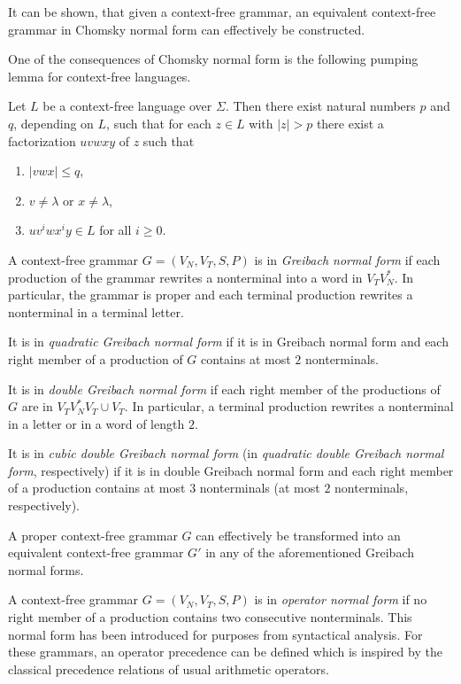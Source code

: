 It can be shown, that given a context-free grammar, an equivalent context-free grammar in Chomsky normal form can effectively be constructed.

One of the consequences of Chomsky normal form is the following pumping lemma for context-free languages.

\begin{lemma}
Let $L$ be a context-free language over $\Sigma$. Then there exist natural numbers $p$ and $q$, depending on $L$, such that for each $z \in L$ with $|z| > p$ there exist a factorization $u v w x y$ of $z$ such that
\begin{enumerate}
\item $|vwx| \le q$,
\item $v \neq \lambda$ or $x \neq \lambda$,
\item $u v^i w x^i y \in L$ for all $i \ge 0$.
\end{enumerate}
\end{lemma}

A context-free grammar $G = (V_N, V_T, S, P)$ is in \emph{Greibach normal form} if each production of the grammar rewrites a nonterminal into a word in $V_T V_N^*$. In particular, the grammar is proper and each terminal production rewrites a nonterminal in a terminal letter.

It is in \emph{quadratic Greibach normal form} if it is in Greibach normal form and each right member of a production of $G$ contains at most $2$ nonterminals.

It is in \emph{double Greibach normal form} if each right member of the productions  of $G$ are in $V_T V_N^* V_T \cup V_T$. In particular, a terminal production  rewrites a nonterminal in a letter or in a word of length $2$.

It is in \emph{cubic double Greibach normal form} (in \emph{quadratic double Greibach normal form}, respectively) if it is in double Greibach normal form and each right member of a production contains at most $3$ nonterminals (at most $2$ nonterminals, respectively).

A proper context-free grammar $G$ can effectively be transformed into an equivalent context-free grammar $G'$ in any of the aforementioned Greibach normal forms.

A context-free grammar $G = (V_N, V_T, S, P)$ is in \emph{operator normal form} if no right member of a production contains two consecutive nonterminals. This normal form has been introduced for purposes from syntactical analysis. For these grammars, an operator precedence can be defined which is inspired by the classical precedence relations of usual arithmetic operators.

